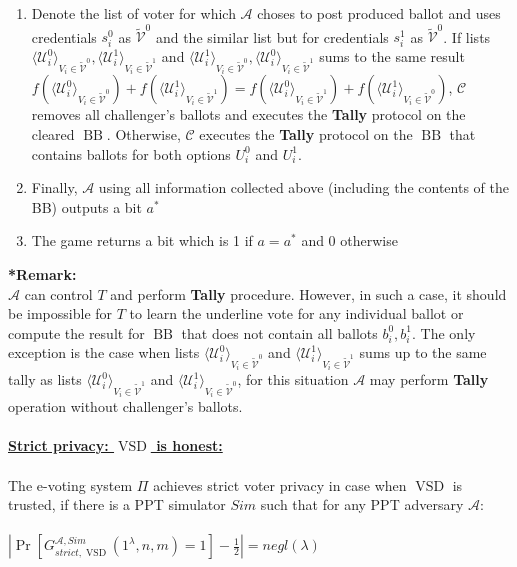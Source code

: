 \documentclass[12pt]{article}
\DeclareMathOperator{\vsd}{VSD}
\DeclareMathOperator{\bb}{BB}
\begin{document}
\begin{enumerate}
\item Denote the list of voter for which $\mathcal{A}$ choses to post produced ballot and uses credentials $s_i^0$  as $ \tilde{\mathcal{V}}^0$ and the similar list but for credentials $s_i^1$ as $ \tilde{\mathcal{V}}^0$.  If  lists $\langle \mathcal{U}^0_i \rangle _{V_i \in \tilde{\mathcal{V}}^0}, \langle \mathcal{U}^1_i \rangle _{V_i \in \tilde{\mathcal{V}}^1}$ and $\langle \mathcal{U}^1_i \rangle _{V_i \in \tilde{\mathcal{V}}^0}, \langle \mathcal{U}^0_i \rangle _{V_i \in \tilde{\mathcal{V}}^1}$ sums to the same result $f(\langle \mathcal{U}^0_i \rangle _{V_i \in \tilde{\mathcal{V}}^0} ) + f(\langle \mathcal{U}^1_i \rangle _{V_i \in \tilde{\mathcal{V}}^1} ) =  f(\langle \mathcal{U}^0_i \rangle _{V_i \in \tilde{\mathcal{V}}^1} ) +  f(\langle \mathcal{U}^1_i \rangle _{V_i \in \tilde{\mathcal{V}}^0} )$, $\mathcal{C}$ removes all challenger's ballots and executes the \textbf{Tally} protocol on the cleared $\bb$. Otherwise, $\mathcal{C}$ executes the \textbf{Tally} protocol on the $\bb$ that contains ballots for both options $U_i^0$ and $U_i^1$. 
\item Finally, $\mathcal{A}$ using all information collected above (including the contents of the BB) outputs a bit $a^*$
\item The game returns a bit which is 1 if $a = a^*$ and 0 otherwise
\end{enumerate}
\textbf{*Remark:}\\
$\mathcal{A}$ can control $T$ and perform \textbf{Tally} procedure. However, in such a case, it should be impossible for $T$ to learn the underline vote for any individual ballot or compute the result for $\bb$ that does not contain all ballots $b_i^0,b_i^1$. The only exception is the case when lists  $\langle \mathcal{U}^0_i \rangle _{V_i \in \tilde{\mathcal{V}}^0} $ and  $\langle \mathcal{U}^1_i \rangle _{V_i \in \tilde{\mathcal{V}}^1} $ sums up to the same tally as lists  $\langle \mathcal{U}^0_i \rangle _{V_i \in \tilde{\mathcal{V}}^1} $ and  $\langle \mathcal{U}^1_i \rangle _{V_i \in \tilde{\mathcal{V}}^0} $, for this situation $\mathcal{A}$ may perform \textbf{Tally} operation without challenger's ballots. \\\\

\underline{\textbf{Strict privacy: $\vsd$ is honest:}}\\\\
The e-voting system $\Pi$ achieves strict voter privacy in case when $\vsd$ is trusted, if there is a PPT simulator $Sim$ such that for any PPT adversary $\mathcal{A}$:\\\\
 $|\Pr[G_{strict,\vsd}^{\mathcal{A},Sim}(1^{\lambda},n,m) = 1] - \frac{1}{2}| = negl(\lambda)$\\\\
 
\end{document}
